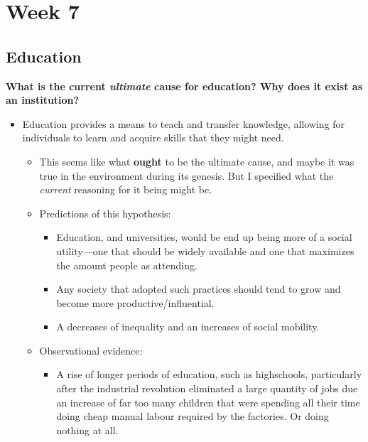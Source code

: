 \documentclass[12pt,a4paper]{article}
\begin{document}
\clearpage
\section*{Week 7}
{}

\subsection{Education}
\textbf{What is the current \textit{ultimate} cause for education? Why does it exist as an institution? }
\begin{itemize}
    \item Education provides a means to teach and transfer knowledge, allowing for individuals to learn and acquire skills that they might need.
        \begin{itemize}
            \item This seems like what \textbf{ought} to be the ultimate cause, and maybe it was true in the environment during its genesis. But I specified what the \textit{current} reasoning for it being might be.
            \item Predictions of this hypothesis:
                \begin{itemize}
                    \item Education, and universities, would be end up being more of a social utility---one that should be widely available and one that maximizes the amount people as attending. 
                    \item Any society that adopted such practices should tend to grow and become more productive/influential.
                    \item A decreases of inequality and an increases of social mobility.
                \end{itemize}
            \item Observational evidence:
                \begin{itemize}
                    \item A rise of longer periods of education, such as highschools, particularly after the industrial revolution eliminated a large quantity of jobs due an increase of far too many children that were spending all their time doing cheap manual labour required by the factories. Or doing nothing at all. 
                        \begin{itemize}

\end{itemize}
\end{itemize}
\end{itemize}
\end{itemize}
\end{document}
